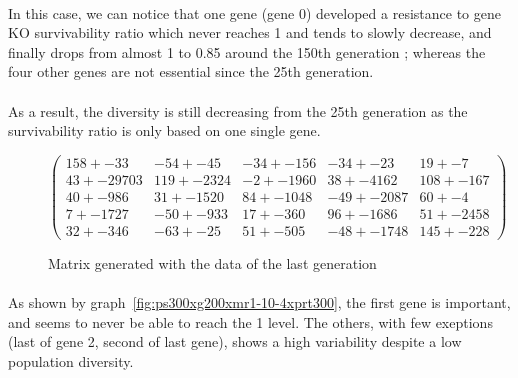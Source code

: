 \documentclass[]{report} %
\begin{document}
    \paragraph*{}
    In this case, we can notice that one gene (gene 0) developed a resistance to gene KO survivability ratio which never reaches 1 and tends to slowly decrease, 
    and finally drops from almost 1 to 0.85 around the 150th generation ; whereas the four other genes are not essential since the 25th generation.
    \paragraph*{}
    As a result, the diversity is still decreasing from the 25th generation as the survivability ratio is only based on one single gene.

    \begin{figure}[H] 
            \centering
            \small
    $
          \begin{pmatrix}
                158 +- 33 & -54 +- 45 & -34 +- 156 & -34 +- 23 & 19 +- 7 \\
                43 +- 29703 & 119 +- 2324 & -2 +- 1960 & 38 +- 4162 & 108 +- 167 \\
                40 +- 986 & 31 +- 1520 & 84 +- 1048 & -49 +- 2087 & 60 +- 4 \\
                7 +- 1727 & -50 +- 933 & 17 +- 360 & 96 +- 1686 & 51 +- 2458 \\
                32 +- 346 & -63 +- 25 & 51 +- 505 & -48 +- 1748 & 145 +- 228 
           \end{pmatrix}
    $
            \caption{\footnotesize Matrix generated with the data of the last generation}
            \label{mat:ps300xg200xmr1-10-4xprt300}
    \end{figure}
    \paragraph*{}
    As shown by graph~\ref{fig:ps300xg200xmr1-10-4xprt300}, the first gene is important, and seems to never be able to reach the 1 level.
    The others, with few exeptions (last of gene 2, second of last gene), shows a high variability despite a low population diversity.
    
    
    
    
\end{document}
